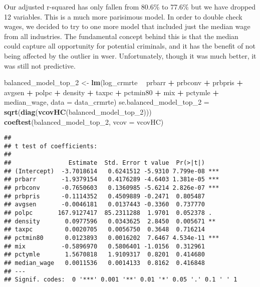 \documentclass[
]{article}
\newenvironment{Shaded}{\begin{snugshade}}{\end{snugshade}}
\newcommand{\DataTypeTok}[1]{\textcolor[rgb]{0.13,0.29,0.53}{#1}}
\newcommand{\DecValTok}[1]{\textcolor[rgb]{0.00,0.00,0.81}{#1}}
\newcommand{\KeywordTok}[1]{\textcolor[rgb]{0.13,0.29,0.53}{\textbf{#1}}}
\newcommand{\NormalTok}[1]{#1}
\newcommand{\OperatorTok}[1]{\textcolor[rgb]{0.81,0.36,0.00}{\textbf{#1}}}
\newcommand{\StringTok}[1]{\textcolor[rgb]{0.31,0.60,0.02}{#1}}
\begin{document}
Our adjusted r-squared has only fallen from 80.6\% to 77.6\% but we have
dropped 12 variables. This is a much more parisimous model. In order to
double check wages, we decided to try to one more model that included
just the median wage from all industries. The fundamental concept behind
this is that the median could capture all opportunity for potential
criminals, and it has the benefit of not being affected by the outlier
in wser. Unfortunately, though it was much better, it was still not
predictive.

\begin{Shaded}
\begin{Highlighting}[]
\NormalTok{balanced_model_top_}\DecValTok{2}\NormalTok{ <-}\StringTok{ }\KeywordTok{lm}\NormalTok{(log_crmrte }\OperatorTok{~}\StringTok{ }\NormalTok{prbarr }\OperatorTok{+}\StringTok{ }\NormalTok{prbconv }\OperatorTok{+}\StringTok{ }\NormalTok{prbpris }
                             \OperatorTok{+}\StringTok{ }\NormalTok{avgsen }\OperatorTok{+}\StringTok{ }\NormalTok{polpc }\OperatorTok{+}\StringTok{ }\NormalTok{density}
                             \OperatorTok{+}\StringTok{ }\NormalTok{taxpc }\OperatorTok{+}\StringTok{ }\NormalTok{pctmin80 }\OperatorTok{+}\StringTok{ }\NormalTok{mix }\OperatorTok{+}\StringTok{ }\NormalTok{pctymle}
                             \OperatorTok{+}\StringTok{ }\NormalTok{median_wage,}
                             \DataTypeTok{data =}\NormalTok{ data_crmrte)}
\NormalTok{se.balanced_model_top_}\DecValTok{2}\NormalTok{ =}\StringTok{ }\KeywordTok{sqrt}\NormalTok{(}\KeywordTok{diag}\NormalTok{(}\KeywordTok{vcovHC}\NormalTok{(balanced_model_top_}\DecValTok{2}\NormalTok{)))}
\KeywordTok{coeftest}\NormalTok{(balanced_model_top_}\DecValTok{2}\NormalTok{, }\DataTypeTok{vcov =}\NormalTok{ vcovHC)}
\end{Highlighting}
\end{Shaded}

\begin{verbatim}
## 
## t test of coefficients:
## 
##                Estimate  Std. Error t value  Pr(>|t|)    
## (Intercept)  -3.7018614   0.6241512 -5.9310 7.799e-08 ***
## prbarr       -1.9379154   0.4176289 -4.6403 1.381e-05 ***
## prbconv      -0.7650603   0.1360985 -5.6214 2.826e-07 ***
## prbpris      -0.1114352   0.4509889 -0.2471  0.805487    
## avgsen       -0.0046181   0.0137443 -0.3360  0.737770    
## polpc       167.9127417  85.2311288  1.9701  0.052378 .  
## density       0.0977596   0.0343625  2.8450  0.005671 ** 
## taxpc         0.0020705   0.0056750  0.3648  0.716214    
## pctmin80      0.0123893   0.0016202  7.6467 4.534e-11 ***
## mix          -0.5896970   0.5806401 -1.0156  0.312961    
## pctymle       1.5670818   1.9109317  0.8201  0.414680    
## median_wage   0.0011536   0.0014133  0.8162  0.416848    
## ---
## Signif. codes:  0 '***' 0.001 '**' 0.01 '*' 0.05 '.' 0.1 ' ' 1
\end{verbatim}
\end{document}
